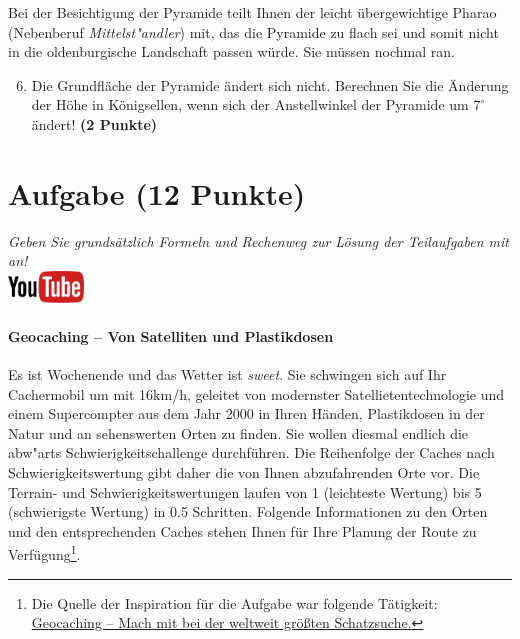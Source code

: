 \documentclass[a4paper, 9pt]{scrartcl}\usepackage[]{graphicx}\usepackage[]{xcolor}
\begin{document}
Bei der Besichtigung der Pyramide teilt Ihnen der leicht {\"u}bergewichtige
Pharao (Nebenberuf \textit{Mittelst{"a}ndler}) mit, das die Pyramide zu
flach sei und somit nicht in die oldenburgische Landschaft passen
w{\"u}rde. Sie m{\"u}ssen nochmal ran.

\begin{enumerate}
  \setcounter{enumi}{5}
\item Die Grundfl{\"a}che der Pyramide {\"a}ndert sich nicht. Berechnen Sie die
  {\"A}nderung der H{\"o}he in K{\"o}nigsellen, wenn sich der Anstellwinkel der
  Pyramide um $7^\circ$ {\"a}ndert!  \textbf{(2 Punkte)}
\end{enumerate}



\clearpage

\section{Aufgabe \hfill (12 Punkte)}

\textit{Geben Sie grunds{\"a}tzlich Formeln und Rechenweg zur L{\"o}sung der
  Teilaufgaben mit an!} \\[1Ex]

\hfill\href{https://youtu.be/3LAq3R0rS14}{\includegraphics[width =
  2cm]{img/youtube}} %
\hspace{2Ex}

\paragraph{Geocaching -- Von Satelliten und Plastikdosen}



Es ist Wochenende und das Wetter ist \textit{sweet}. Sie schwingen sich auf
Ihr Cachermobil um mit 16km/h, geleitet von modernster
Satellietentechnologie und einem Supercompter aus dem Jahr 2000 in Ihren
H{\"a}nden, Plastikdosen in der Natur und an sehenswerten Orten zu finden. Sie
wollen diesmal endlich die abw{"a}rts Schwierigkeitschallenge
durchf{\"u}hren. Die Reihenfolge der Caches nach Schwierigkeitswertung gibt daher
die von Ihnen abzufahrenden Orte vor. Die Terrain- und
Schwierigkeitswertungen laufen von 1 (leichteste Wertung) bis 5
(schwierigste Wertung) in 0.5 Schritten. Folgende Informationen zu den
Orten und den entsprechenden Caches stehen Ihnen f{\"u}r Ihre Planung der Route
zu Verf{\"u}gung\footnote{Die Quelle der Inspiration
  für die Aufgabe war folgende Tätigkeit:
  \href{https://www.geocaching.com/play}{Geocaching -- Mach mit bei der weltweit größten Schatzsuche.}}.
\end{document}
